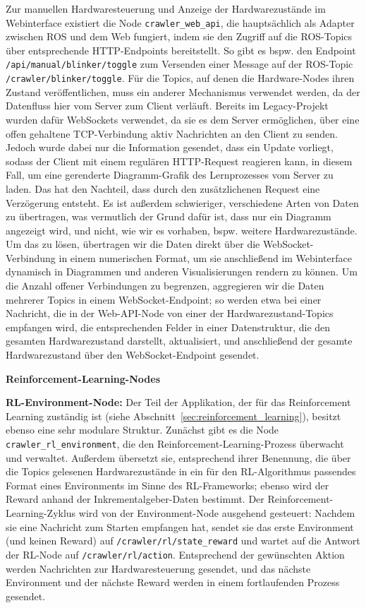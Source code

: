Zur manuellen Hardwaresteuerung und Anzeige der Hardwarezustände im Webinterface existiert die Node \texttt{crawler\_web\_api}, die hauptsächlich als Adapter zwischen ROS und dem Web fungiert, indem sie den Zugriff auf die ROS-Topics über entsprechende HTTP-Endpoints bereitstellt. So gibt es bspw. den Endpoint \texttt{/api/manual/blinker/toggle} zum Versenden einer Message auf der ROS-Topic \texttt{/crawler/blinker/toggle}. Für die Topics, auf denen die Hardware-Nodes ihren Zustand veröffentlichen, muss ein anderer Mechanismus verwendet werden, da der Datenfluss hier vom Server zum Client verläuft. Bereits im Legacy-Projekt wurden dafür WebSockets verwendet, da sie es dem Server ermöglichen, über eine offen gehaltene TCP-Verbindung aktiv Nachrichten an den Client zu senden. Jedoch wurde dabei nur die Information gesendet, dass ein Update vorliegt, sodass der Client mit einem regulären HTTP-Request reagieren kann, in diesem Fall, um eine gerenderte Diagramm-Grafik des Lernprozesses vom Server zu laden. Das hat den Nachteil, dass durch den zusätzlichenen Request eine Verzögerung entsteht. Es ist außerdem schwieriger, verschiedene Arten von Daten zu übertragen, was vermutlich der Grund dafür ist, dass nur ein Diagramm angezeigt wird, und nicht, wie wir es vorhaben, bspw. weitere Hardwarezustände. Um das zu lösen, übertragen wir die Daten direkt über die WebSocket-Verbindung in einem numerischen Format, um sie anschließend im Webinterface dynamisch in Diagrammen und anderen Visualisierungen rendern zu können. Um die Anzahl offener Verbindungen zu begrenzen, aggregieren wir die Daten mehrerer Topics in einem WebSocket-Endpoint; so werden etwa bei einer Nachricht, die in der Web-API-Node von einer der Hardwarezustand-Topics empfangen wird, die entsprechenden Felder in einer Datenstruktur, die den gesamten Hardwarezustand darstellt, aktualisiert, und anschließend der gesamte Hardwarezustand über den WebSocket-Endpoint gesendet. 

\textbf{Reinforcement-Learning-Nodes}

\textbf{RL-Environment-Node:} Der Teil der Applikation, der für das Reinforcement Learning zuständig ist (siehe Abschnitt~\ref{sec:reinforcement_learning}), besitzt ebenso eine sehr modulare Struktur. Zunächst gibt es die Node \texttt{crawler\_rl\_environment}, die den Reinforcement-Learning-Prozess überwacht und verwaltet. Außerdem übersetzt sie, entsprechend ihrer Benennung, die über die Topics gelesenen Hardwarezustände in ein für den RL-Algorithmus passendes Format eines Environments im Sinne des RL-Frameworks; ebenso wird der Reward anhand der Inkrementalgeber-Daten bestimmt. Der Reinforcement-Learning-Zyklus wird von der Environment-Node ausgehend gesteuert: Nachdem sie eine Nachricht zum Starten empfangen hat, sendet sie das erste Environment (und keinen Reward) auf \texttt{/crawler/rl/state\_reward} und wartet auf die Antwort der RL-Node auf \texttt{/crawler/rl/action}. Entsprechend der gewünschten Aktion werden Nachrichten zur Hardwaresteuerung gesendet, und das nächste Environment und der nächste Reward werden in einem fortlaufenden Prozess gesendet.

